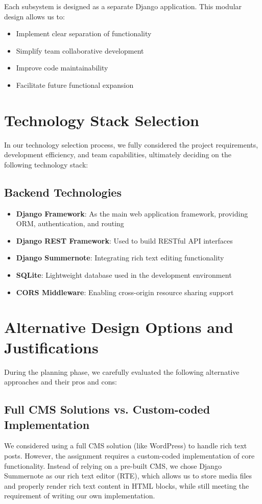 Each subsystem is designed as a separate Django application. This modular design allows us to:
\begin{itemize}
    \item Implement clear separation of functionality
    \item Simplify team collaborative development
    \item Improve code maintainability
    \item Facilitate future functional expansion
\end{itemize}

\section{Technology Stack Selection}

In our technology selection process, we fully considered the project requirements, development efficiency, and team capabilities, ultimately deciding on the following technology stack:

\subsection{Backend Technologies}
\begin{itemize}
    \item \textbf{Django Framework}: As the main web application framework, providing ORM, authentication, and routing
    \item \textbf{Django REST Framework}: Used to build RESTful API interfaces
    \item \textbf{Django Summernote}: Integrating rich text editing functionality
    \item \textbf{SQLite}: Lightweight database used in the development environment
    \item \textbf{CORS Middleware}: Enabling cross-origin resource sharing support
\end{itemize}

\section{Alternative Design Options and Justifications}
During the planning phase, we carefully evaluated the following alternative approaches and their pros and cons:

\subsection{Full CMS Solutions vs. Custom-coded Implementation}
We considered using a full CMS solution (like WordPress) to handle rich text posts. However, the assignment requires a custom-coded implementation of core functionality. Instead of relying on a pre-built CMS, we chose Django Summernote as our rich text editor (RTE), which allows us to store media files and properly render rich text content in HTML blocks, while still meeting the requirement of writing our own implementation.

